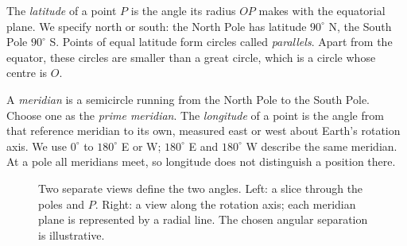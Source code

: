 The \emph{latitude} of a point $P$ is the angle its radius $OP$ makes
with the equatorial plane. We specify north or south: the North Pole has
latitude $90^\circ$ N, the South Pole $90^\circ$ S. Points of equal latitude
form circles called \emph{parallels}. Apart from the equator, these circles
are smaller than a great circle, which is a circle whose centre is $O$.

A \emph{meridian} is a semicircle running from the North Pole to the South
Pole. Choose one as the \emph{prime meridian}. The \emph{longitude} of a
point is the angle from that reference meridian to its own, measured east
or west about Earth's rotation axis. We use $0^\circ$ to $180^\circ$ E or W;
$180^\circ$ E and $180^\circ$ W describe the same meridian. At a pole all
meridians meet, so longitude does not distinguish a position there.

\begin{figure}[htbp]\centering
{}
\caption{Two separate views define the two angles. Left: a slice through the poles and $P$. Right: a view along the rotation axis; each meridian plane is represented by a radial line. The chosen angular separation is illustrative.}
\label{fig:geo-latlong}
\end{figure}

